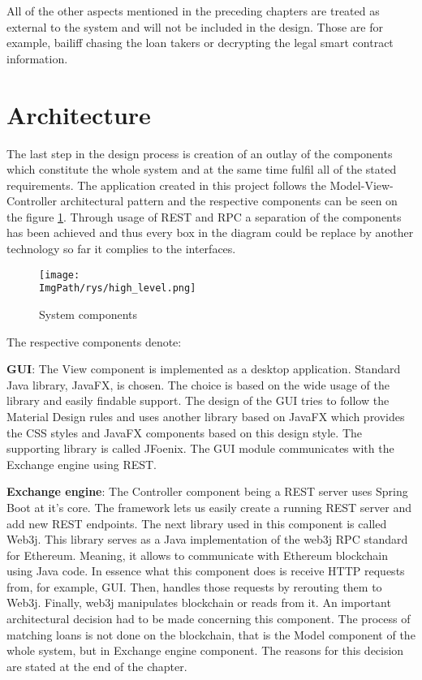 \documentclass[a4paper,12pt,twoside,openany]{report}
\newcommand{\ImgPath}{.}
\begin{document}
All of the other aspects mentioned in the preceding chapters are treated as external to the system and will not be included in the design. Those are for example, bailiff chasing the loan takers or decrypting the legal smart contract information.

\section{Architecture} \label{architecture}

The last step in the design process is creation of an outlay of the components which constitute the whole system and at the same time fulfil all of the stated requirements. The application created in this project  follows the Model-View-Controller architectural pattern and the respective components can be seen on the figure \ref{system components}. Through usage of REST and RPC a separation of the components has been achieved and thus every box in the diagram could be replace by another technology so far it complies to the interfaces.

\begin{figure}[!htbp]
	\begin{center}
\centering
\texttt{[image: \\ImgPath/rys/high\_level.png]}
\end{center}
	\caption{System components}
	\label{system components}
\end{figure}

The respective components denote:

\textbf{GUI}: The View component is implemented as a desktop application. Standard Java library, JavaFX, is chosen. The choice is based on the wide usage of the library and easily findable support. The design of the GUI tries to follow the Material Design rules \cite{material} and uses another library based on JavaFX which provides the CSS styles and JavaFX components based on this design style. The supporting library is called JFoenix. The GUI module communicates with the Exchange engine using REST.

\textbf{Exchange engine}: The Controller component being a REST server uses Spring Boot at it's core. The framework lets us easily create a running REST server and add new REST endpoints. The next library used in this component is called Web3j. This library serves as a Java implementation of the web3j RPC standard for Ethereum. Meaning, it allows to communicate with Ethereum blockchain using Java code. In essence what this component does is receive HTTP requests from, for example, GUI. Then, handles those requests by rerouting them to Web3j. Finally, web3j manipulates blockchain or reads from it. An important architectural decision had to be made concerning this component. The process of matching loans is not done on the blockchain, that is the Model component of the whole system, but in Exchange engine component. The reasons for this decision are stated at the end of the chapter.
\end{document}
